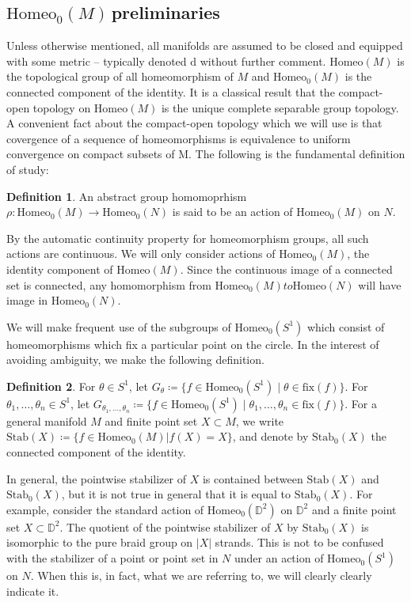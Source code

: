 \documentclass[10pt, oneside]{article}
\newcommand{\D}{\mathbb{D}}
\newcommand{\homeo}[1][S^1]{\text{Homeo}_0(#1)}
\newcommand{\stab}[1]{\text{Stab}(#1)}
\newcommand{\pstab}[1]{\text{Stab}_0(#1)}
\newcommand{\titlesafehomeoM}{\texorpdfstring{$\homeo[M]\,$}{Homeo\_0(M)}}
\theoremstyle{definition}
\newtheorem{defn}{Definition}[section]
\theoremstyle{definition}
\begin{document}
\subsection{\titlesafehomeoM preliminaries}\label{subsec:homeoprelims}

Unless otherwise mentioned, all manifolds are assumed to be closed and equipped with some metric -- typically denoted $\mathrm{d}$ without further comment. $\text{Homeo}(M)$ is the topological group of all homeomorphism of $M$ and $\homeo[M]$ is the connected component of the identity. It is a classical result that the compact-open topology on $\text{Homeo}(M)$ is the unique complete separable group topology\cite{kallman:UniquenessResults}. A convenient fact about the compact-open topology which we will use is that covergence of a sequence of homeomorphisms is equivalence to uniform convergence on compact subsets of M. The following is the fundamental definition of study:

\begin{defn}
    An abstract group homomoprhism $\rho: \homeo[M]\to\homeo[N]$ is said to be an action of $\homeo[M]$ on $N$. 
\end{defn}

By the automatic continuity property for homeomorphism groups\cite{mann:AutomaticContinuity}, all such actions are continuous. We will only consider actions of $\homeo[M]$, the identity component of $\text{Homeo}(M)$. Since the continuous image of a connected set is connected, any homomorphism from $\homeo[M] to\text{Homeo}(N)$ will have image in $\homeo[N]$.

We will make frequent use of the subgroups of $\homeo$ which consist of homeomorphisms which fix a particular point on the circle. In the interest of avoiding ambiguity, we make the following definition.

\begin{defn}
     For $\theta\in S^1$, let $G_\theta\coloneqq\{f\in\homeo[S^1]\;\vert\; \theta\in\text{fix}(f)\}$.
     For $\theta_1,\dots,\theta_n\in S^1$, let $G_{\theta_1,\dots,\theta_n}\coloneqq \{f\in\homeo\;\vert\; \theta_1,\dots,\theta_n\in\text{fix}(f)\}$.
     For a general manifold $M$ and finite point set $X\subset M$, we write $\stab{X}\coloneqq\{f\in\homeo[M]\vert f(X) = X\}$, and denote by $\pstab{X}$ the connected component of the identity.
\end{defn}

In general, the pointwise stabilizer of $X$ is contained between $\stab{X}$ and $\pstab{X}$, but it is not true in general that it is equal to $\pstab{X}$. For example, consider the standard action of $\homeo[\D^2]$ on $\D^2$ and a finite point set $X\subset \D^2$. The quotient of the pointwise stabilizer of $X$ by $\pstab{X}$ is isomorphic to the pure braid group on $|X|$ strands. This is not to be confused with the stabilizer of a point or point set in $N$ under an action of $\homeo$ on $N$. When this is, in fact, what we are referring to, we will clearly clearly indicate it. 
\end{document}
